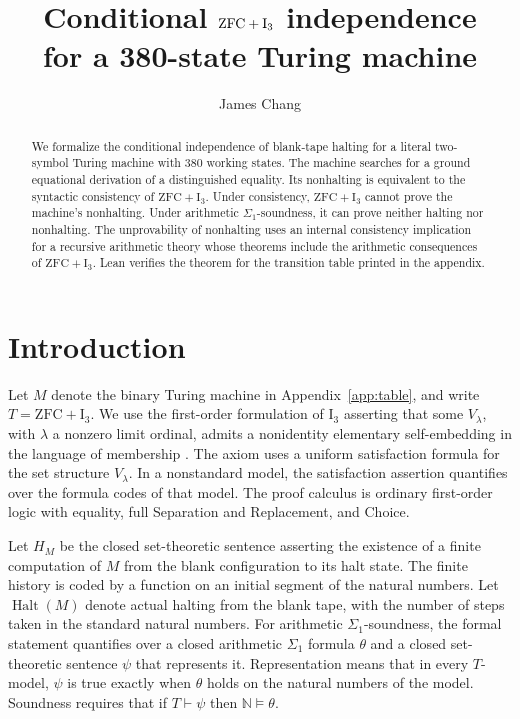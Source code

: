 \documentclass[11pt,letterpaper]{article}
\title{Conditional \texorpdfstring{$\ZFC+\Ithree$}{ZFC + I3} independence\texorpdfstring{\\}{ }for a 380-state Turing machine}
\author{James Chang}
\date{}
\newcommand{\ZFC}{\mathrm{ZFC}}
\newcommand{\Ithree}{\mathrm{I}_3}
\newcommand{\Halt}{\operatorname{Halt}}
\begin{document}
\maketitle

\begin{abstract}
We formalize the conditional independence of blank-tape halting for a
literal two-symbol Turing machine with 380 working states. The machine
searches for a ground equational derivation of a distinguished equality.
Its nonhalting is equivalent to the syntactic consistency of
$\ZFC+\Ithree$. Under consistency, $\ZFC+\Ithree$ cannot prove the
machine's nonhalting. Under arithmetic $\Sigma_1$-soundness, it can
prove neither halting nor nonhalting. The unprovability of nonhalting
uses an internal consistency implication for a recursive arithmetic
theory whose theorems include the arithmetic consequences of
$\ZFC+\Ithree$. Lean verifies the theorem for the transition table
printed in the appendix.
\end{abstract}

\section{Introduction}\label{sec:result}

Let $M$ denote the binary Turing machine in Appendix~\ref{app:table},
and write $T=\ZFC+\Ithree$. We use the first-order formulation of
$\Ithree$ asserting that some $V_\lambda$, with $\lambda$ a nonzero
limit ordinal, admits a nonidentity elementary self-embedding in the
language of membership \cite{corazza}. The axiom uses a uniform
satisfaction formula for the set structure $V_\lambda$. In a
nonstandard model, the satisfaction assertion quantifies over the
formula codes of that model. The proof calculus is ordinary
first-order logic with equality, full Separation and Replacement, and
Choice.

Let $H_M$ be the closed set-theoretic sentence asserting the existence
of a finite computation of $M$ from the blank configuration to its
halt state. The finite history is coded by a function on an initial
segment of the natural numbers. Let $\Halt(M)$ denote actual halting
from the blank tape, with the number of steps taken in the standard
natural numbers. For arithmetic $\Sigma_1$-soundness, the formal statement
quantifies over a closed arithmetic $\Sigma_1$ formula $\theta$ and a
closed set-theoretic sentence $\psi$ that represents it. Representation
means that in every $T$-model, $\psi$ is true exactly when $\theta$ holds
on the natural numbers of the model. Soundness requires that if
$T\vdash\psi$ then $\mathbb N\models\theta$.
\end{document}

